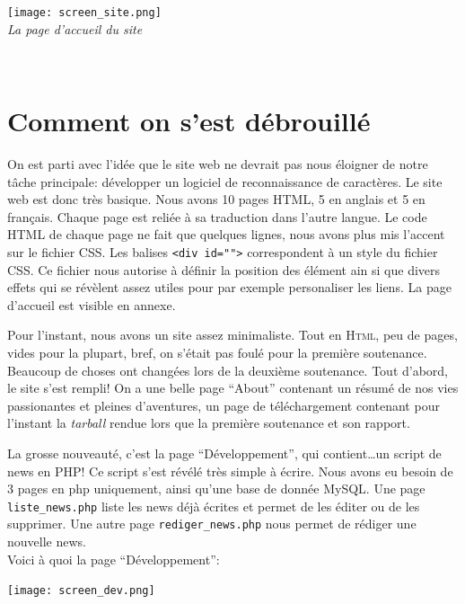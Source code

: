 \documentclass[a4paper,12pt]{report}
\begin{document}
	\begin{center}

		\texttt{[image: screen\_site.png]}\\
		\caption{\emph{La page d'accueil du site}}\\
	\end{center}
	
	
	\section{Comment on s'est d\'ebrouill\'e} %
	\label{sec:comment_on_s_est_d'ebrouill'e}

		On est parti avec l'idée que le site web ne devrait pas nous éloigner de notre tâche principale: développer un logiciel de reconnaissance de caractères. Le site web est donc tr\`es basique. Nous avons 10 pages HTML, 5 en anglais et 5 en fran\c cais. Chaque page est reli\'ee \`a sa traduction dans l'autre langue.
		Le code HTML de chaque page ne fait que quelques lignes, nous avons plus mis l'accent sur le fichier CSS. Les balises \verb!<div id="">! correspondent \`a un style du fichier CSS. Ce fichier nous autorise \`a d\'efinir la position des \'el\'ement ain si que divers effets qui se r\'ev\`elent assez utiles pour par exemple personaliser les liens.
		La page d'accueil est visible en annexe.
		 
		Pour l'instant, nous avons un site assez minimaliste. Tout en \textsc{Html}, peu de pages, vides pour la plupart, bref, on s'\'etait pas foul\'e pour la premi\`ere soutenance. Beaucoup de choses ont chang\'ees lors de la deuxi\`eme soutenance. Tout d'abord, le site s'est rempli! On a une belle page ``About'' contenant un r\'esum\'e de nos vies passionantes et pleines d'aventures, un page de t\'el\'echargement contenant pour l'instant la \emph{tarball} rendue lors que la premi\`ere soutenance et son rapport.

		La grosse nouveaut\'e, c'est la page ``D\'eveloppement'', qui contient\ldots un script de news en PHP! Ce script s'est r\'ev\'el\'e tr\`es simple \`a \'ecrire. Nous avons eu besoin de 3 pages en php uniquement, ainsi qu'une base de donn\'ee MySQL. Une page \verb!liste_news.php! liste les news d\'ej\`a \'ecrites et permet de les \'editer ou de les supprimer. Une autre page \verb!rediger_news.php! nous permet de r\'ediger une nouvelle news. \\
		Voici à quoi la page ``D\'eveloppement'':


		\begin{center}

			\texttt{[image: screen\_dev.png]}\\
			\caption{\emph{ }}\\
		\end{center}
\end{document}
